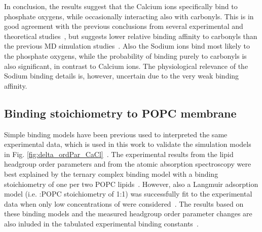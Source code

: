 \documentclass[aip,jcp,twocolumn]{revtex4}
\begin{document}
In conclusion, the results suggest that the Calcium ions specifically bind to phosphate
oxygens, while occasionally interacting also with carbonyls. This is in good agreement
with the previous conclusions from several experimental and theoretical
studies~\cite{hauser76,hauser78,herbette84,cevc90,binder02}, but
suggests lower relative binding affinity to carbonyls than the previous MD simulation
studies~\cite{bockmann03,bockmann04,melcrova16,javanainen17}.
Also the Sodium ions bind most likely to the phosphate oxygens, while the probability
of binding purely to carbonyls is also significant, in contrast to Calcium ions.
The physiological relevance of the Sodium binding details is, however, uncertain
due to the very weak binding affinity.

\subsection{Binding stoichiometry to POPC membrane}


Simple binding models have been previous used to interpreted 
the same experimental data, which is used in this work to validate
the simulation models in Fig. \ref{fig:delta_ordPar_CaCl}~\cite{altenbach84,macdonald87}.
The experimental results from the lipid headgroup order parameters and from the
atomic absorption spectroscopy were best
explained by the ternary complex binding model with a binding
stoichiometry of one  per two POPC lipids~\cite{altenbach84}.
However, also a Langmuir adsorption model (i.e. :POPC stoichiometry of 1:1) 
was successfully fit to the experimental data when only low concentrations of  were considered~\cite{macdonald87}.
The results based on these binding models and the measured headgroup order parameter changes
are also inluded in the tabulated experimental binding constants~\cite{marsh13}.
\end{document}
